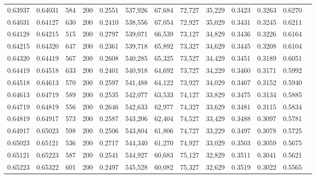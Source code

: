 \begin{tabular}{rrrrrrrrrrrrr}
0.63937 & 0.64031 &   584 & 200 &                                     0.2551 & 537,926 &  67,684 &  72,727 &  35,229 & 0.3423 & 0.3263 & 0.6270 \\
0.64031 & 0.64127 &   630 & 200 &                                     0.2410 & 538,556 &  67,054 &  72,927 &  35,029 & 0.3431 & 0.3245 & 0.6211 \\
0.64128 & 0.64215 &   515 & 200 &                                     0.2797 & 539,071 &  66,539 &  73,127 &  34,829 & 0.3436 & 0.3226 & 0.6164 \\
0.64215 & 0.64320 &   647 & 200 &                                     0.2361 & 539,718 &  65,892 &  73,327 &  34,629 & 0.3445 & 0.3208 & 0.6104 \\
0.64320 & 0.64419 &   567 & 200 &                                     0.2608 & 540,285 &  65,325 &  73,527 &  34,429 & 0.3451 & 0.3189 & 0.6051 \\
0.64419 & 0.64518 &   633 & 200 &                                     0.2401 & 540,918 &  64,692 &  73,727 &  34,229 & 0.3460 & 0.3171 & 0.5992 \\
0.64518 & 0.64613 &   570 & 200 &                                     0.2597 & 541,488 &  64,122 &  73,927 &  34,029 & 0.3467 & 0.3152 & 0.5940 \\
0.64613 & 0.64719 &   589 & 200 &                                     0.2535 & 542,077 &  63,533 &  74,127 &  33,829 & 0.3475 & 0.3134 & 0.5885 \\
0.64719 & 0.64819 &   556 & 200 &                                     0.2646 & 542,633 &  62,977 &  74,327 &  33,629 & 0.3481 & 0.3115 & 0.5834 \\
0.64819 & 0.64917 &   573 & 200 &                                     0.2587 & 543,206 &  62,404 &  74,527 &  33,429 & 0.3488 & 0.3097 & 0.5781 \\
0.64917 & 0.65023 &   598 & 200 &                                     0.2506 & 543,804 &  61,806 &  74,727 &  33,229 & 0.3497 & 0.3078 & 0.5725 \\
0.65023 & 0.65121 &   536 & 200 &                                     0.2717 & 544,340 &  61,270 &  74,927 &  33,029 & 0.3503 & 0.3059 & 0.5675 \\
0.65121 & 0.65223 &   587 & 200 &                                     0.2541 & 544,927 &  60,683 &  75,127 &  32,829 & 0.3511 & 0.3041 & 0.5621 \\
0.65223 & 0.65322 &   601 & 200 &                                     0.2497 & 545,528 &  60,082 &  75,327 &  32,629 & 0.3519 & 0.3022 & 0.5565 \\

\end{tabular}
